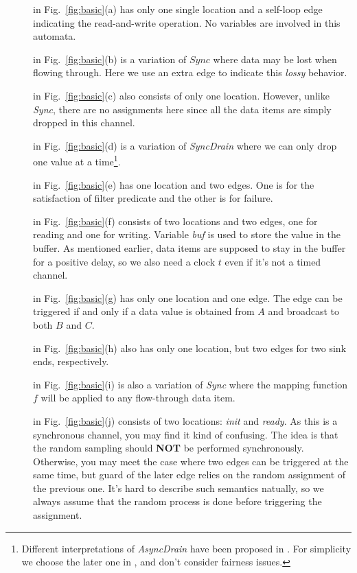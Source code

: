 \begin{description}
    \item[] in Fig.~\ref{fig:basic}(a) has only one single location and a self-loop edge indicating the read-and-write operation. No variables are involved in this automata.
    \item[] in Fig.~\ref{fig:basic}(b) is a variation of $Sync$ where data may be lost when flowing through. Here we use an extra edge to indicate this \emph{lossy} behavior.
    \item[] in Fig.~\ref{fig:basic}(c) also consists of only one location. However, unlike \emph{Sync}, there are no assignments here since all the data items are simply dropped in this channel.
    \item[] in Fig.~\ref{fig:basic}(d) is a variation of \emph{SyncDrain} where we can only drop one value at a time\footnote{Different interpretations of \emph{AsyncDrain} have been proposed in \cite{ARBAB2004,Baier2006a}. For simplicity we choose the later one in \cite{Baier2006a}, and don't consider fairness issues.}.
    \item[] in Fig.~\ref{fig:basic}(e) has one location and two edges. One is for the satisfaction of filter predicate and the other is for failure.
    \item[] in Fig.~\ref{fig:basic}(f) consists of two locations and two edges, one for reading and one for writing. Variable \emph{buf} is used to store the value in the buffer. As mentioned earlier, data items are supposed to stay in the buffer for a positive delay, so we also need a clock $t$ even if it's not a timed channel.
    \item[] in Fig.~\ref{fig:basic}(g) has only one location and one edge. The edge can be triggered if and only if a data value is obtained from $A$ and broadcast to both $B$ and $C$.
    \item[] in Fig.~\ref{fig:basic}(h) also has only one location, but two edges for two sink ends, respectively.
    \item[] in Fig.~\ref{fig:basic}(i) is also a variation of \emph{Sync} where the mapping function $f$ will be applied to any flow-through data item.
    \item[] in Fig.~\ref{fig:basic}(j) consists of two locations: \emph{init} and \emph{ready}. As this is a synchronous channel, you may find it kind of confusing. The idea is that the random sampling should \textbf{NOT} be performed synchronously. Otherwise, you may meet the case where two edges can be triggered at the same time, but guard of the later edge relies on the random assignment of the previous one. It's hard to describe such semantics natually, so we always assume that the random process is done before triggering the assignment.



\end{description}
